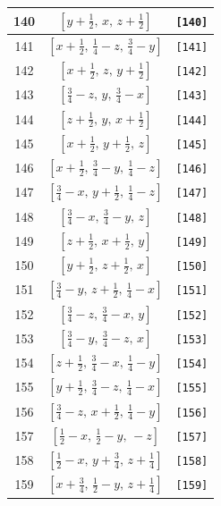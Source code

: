 \documentclass[fleqn,8pt]{jsarticle}
\begin{document}
\begin{longtable}{ccc}
140 & $\left[ y + \frac{1}{2},\, x,\, z + \frac{1}{2} \right]$ & {\tt [140]} \\ \hline
141 & $\left[ x + \frac{1}{2},\, \frac{1}{4} - z,\, \frac{3}{4} - y \right]$ & {\tt [141]} \\ \hline
142 & $\left[ x + \frac{1}{2},\, z,\, y + \frac{1}{2} \right]$ & {\tt [142]} \\ \hline
143 & $\left[ \frac{3}{4} - z,\, y,\, \frac{3}{4} - x \right]$ & {\tt [143]} \\ \hline
144 & $\left[ z + \frac{1}{2},\, y,\, x + \frac{1}{2} \right]$ & {\tt [144]} \\ \hline
145 & $\left[ x + \frac{1}{2},\, y + \frac{1}{2},\, z \right]$ & {\tt [145]} \\ \hline
146 & $\left[ x + \frac{1}{2},\, \frac{3}{4} - y,\, \frac{1}{4} - z \right]$ & {\tt [146]} \\ \hline
147 & $\left[ \frac{3}{4} - x,\, y + \frac{1}{2},\, \frac{1}{4} - z \right]$ & {\tt [147]} \\ \hline
148 & $\left[ \frac{3}{4} - x,\, \frac{3}{4} - y,\, z \right]$ & {\tt [148]} \\ \hline
149 & $\left[ z + \frac{1}{2},\, x + \frac{1}{2},\, y \right]$ & {\tt [149]} \\ \hline
150 & $\left[ y + \frac{1}{2},\, z + \frac{1}{2},\, x \right]$ & {\tt [150]} \\ \hline
151 & $\left[ \frac{3}{4} - y,\, z + \frac{1}{2},\, \frac{1}{4} - x \right]$ & {\tt [151]} \\ \hline
152 & $\left[ \frac{3}{4} - z,\, \frac{3}{4} - x,\, y \right]$ & {\tt [152]} \\ \hline
153 & $\left[ \frac{3}{4} - y,\, \frac{3}{4} - z,\, x \right]$ & {\tt [153]} \\ \hline
154 & $\left[ z + \frac{1}{2},\, \frac{3}{4} - x,\, \frac{1}{4} - y \right]$ & {\tt [154]} \\ \hline
155 & $\left[ y + \frac{1}{2},\, \frac{3}{4} - z,\, \frac{1}{4} - x \right]$ & {\tt [155]} \\ \hline
156 & $\left[ \frac{3}{4} - z,\, x + \frac{1}{2},\, \frac{1}{4} - y \right]$ & {\tt [156]} \\ \hline
157 & $\left[ \frac{1}{2} - x,\, \frac{1}{2} - y,\, - z \right]$ & {\tt [157]} \\ \hline
158 & $\left[ \frac{1}{2} - x,\, y + \frac{3}{4},\, z + \frac{1}{4} \right]$ & {\tt [158]} \\ \hline
159 & $\left[ x + \frac{3}{4},\, \frac{1}{2} - y,\, z + \frac{1}{4} \right]$ & {\tt [159]} \\ \hline

\end{longtable}
\end{document}
